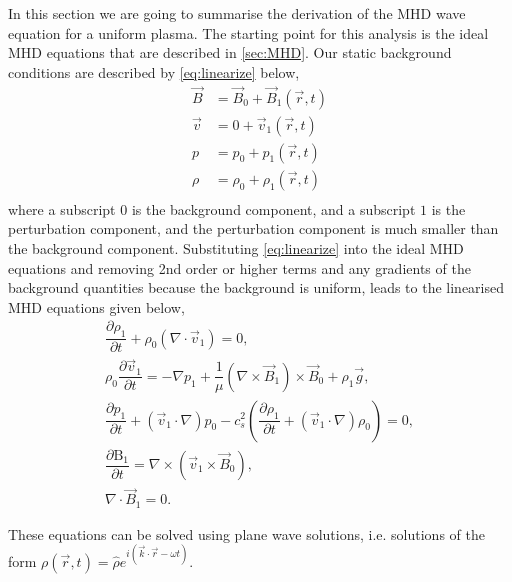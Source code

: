 In this section we are going to summarise the derivation of the MHD wave equation for a uniform plasma.
The starting point for this analysis is the ideal MHD equations that are described in \ref{sec:MHD}.
Our static background conditions are described by \ref{eq:linearize} below,
\begin{equation}\label{eq:linearize}
    \begin{aligned}                                                    
        \vec{B} &= \vec{B}_0 + \vec{B}_1(\vec{r},t)\\
        \vec{v} &= 0 + \vec{v}_1(\vec{r},t)\\
        p &= p_0 + {p_1}(\vec{r},t)\\
        \rho &= \rho_0 + {\rho_1}(\vec{r},t)\\
    \end{aligned}
\end{equation}
where a subscript $0$ is the background component, and a subscript $1$ is the perturbation component, and the perturbation component is much smaller than the background component.
Substituting \ref{eq:linearize} into the ideal MHD equations and removing 2nd order or higher terms and any gradients of the background quantities because the background is uniform, leads to the linearised MHD equations given below,
\begin{align}                                                         
    \dfrac{\partial \rho_1 }{\partial t} + \rho_0 (\nabla \cdot \vec{v}_1) =       
    0,
    \tag{Mass Conservation}\\
    \rho_0 \dfrac{\partial \vec{v}_1}{\partial t} =
    -\nabla p_1 + \dfrac{1}{\mu}(\nabla \times \vec{B}_1) \times \vec{B}_0 + \rho_1 \vec{g},
    \tag{Equation of Motion}\\
    \dfrac{\partial p_1}{\partial t} + (\vec{v}_1 \cdot \nabla)p_0 - c_s^2 \left( \dfrac{\partial \rho_1}{\partial t} + (\vec{v}_1 \cdot \nabla)\rho_0 \right) = 0,
    \tag{Energy Equation}\\
    \dfrac{\partial \mathrm{B}_1}{\partial t} = \nabla \times (\vec{v}_1 \times \vec{B}_0),
    \tag{Induction Equation}\\
    \nabla \cdot \vec{B}_1 = 0.
    \tag{Solenoid Equation}               
\end{align}

These equations can be solved using plane wave solutions, i.e. solutions of the form $\rho(\vec{r}, t) = \hat{\rho} e^{i(\vec{k}\cdot\vec{r} - \omega t)}$.

